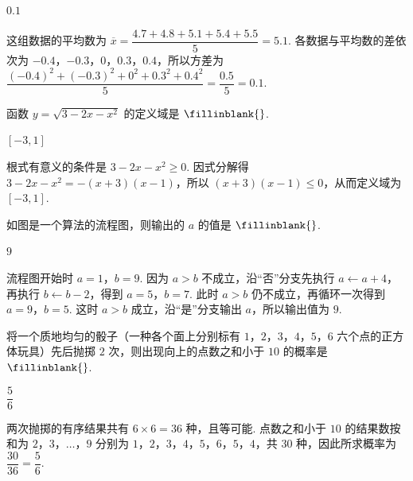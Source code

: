 \begin{answer}
\(0.1\)
\end{answer}

\begin{solution}
这组数据的平均数为 \(\overline{x}=\dfrac{4.7+4.8+5.1+5.4+5.5}{5}=5.1\). 各数据与平均数的差依次为 \(-0.4\)，\(-0.3\)，\(0\)，\(0.3\)，\(0.4\)，所以方差为 \(\dfrac{(-0.4)^2+(-0.3)^2+0^2+0.3^2+0.4^2}{5}=\dfrac{0.5}{5}=0.1\).
\end{solution}

\begin{problem}
函数 \(y=\sqrt{3-2x-x^2}\) 的定义域是 \(\fillinblank{}\).
\end{problem}

\begin{answer}
\([-3,1]\)
\end{answer}

\begin{solution}
根式有意义的条件是 \(3-2x-x^2\ge0\). 因式分解得 \(3-2x-x^2=-(x+3)(x-1)\)，所以 \((x+3)(x-1)\le0\)，从而定义域为 \([-3,1]\).
\end{solution}

\begin{problem}
如图是一个算法的流程图，则输出的 \(a\) 的值是 \(\fillinblank{}\).

\end{problem}

\begin{answer}
\(9\)
\end{answer}

\begin{solution}
流程图开始时 \(a=1\)，\(b=9\). 因为 \(a>b\) 不成立，沿“否”分支先执行 \(a\leftarrow a+4\)，再执行 \(b\leftarrow b-2\)，得到 \(a=5\)，\(b=7\). 此时 \(a>b\) 仍不成立，再循环一次得到 \(a=9\)，\(b=5\). 这时 \(a>b\) 成立，沿“是”分支输出 \(a\)，所以输出值为 \(9\).
\end{solution}

\begin{problem}
将一个质地均匀的骰子（一种各个面上分别标有 \(1\)，\(2\)，\(3\)，\(4\)，\(5\)，\(6\) 六个点的正方体玩具）先后抛掷 \(2\) 次，则出现向上的点数之和小于 \(10\) 的概率是 \(\fillinblank{}\).
\end{problem}

\begin{answer}
\(\dfrac56\)
\end{answer}

\begin{solution}
两次抛掷的有序结果共有 \(6\times6=36\) 种，且等可能. 点数之和小于 \(10\) 的结果数按和为 \(2\)，\(3\)，\(\ldots\)，\(9\) 分别为 \(1\)，\(2\)，\(3\)，\(4\)，\(5\)，\(6\)，\(5\)，\(4\)，共 \(30\) 种，因此所求概率为 \(\dfrac{30}{36}=\dfrac56\).
\end{solution}

